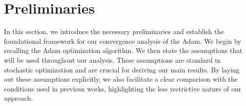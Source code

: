 \documentclass{article} %
\begin{document}







\section{Preliminaries} 
In this section, we introduce the necessary preliminaries and establish the foundational framework for our convergence analysis of the Adam. We begin by recalling the Adam optimization algorithm. We then state the assumptions that will be used throughout our analysis. These assumptions are standard in stochastic optimization and are crucial for deriving our main results. By laying out these assumptions explicitly, we also facilitate a clear comparison with the conditions used in previous works, highlighting the less restrictive nature of our approach.
\end{document}
